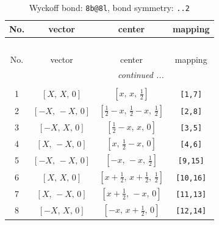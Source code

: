 \documentclass[fleqn,8pt]{jsarticle}
\begin{document}
\begin{longtable}{cccc}
\caption{Wyckoff bond: {\tt 8b@8l}, bond symmetry: {\tt ..2}}
 \\
 \hline \hline
No. & vector & center & mapping \\ \hline \endfirsthead

\multicolumn{3}{l}{\tablename\ \thetable{}} \\
 \hline \hline
No. & vector & center & mapping \\ \hline \endhead

 \hline \hline
\multicolumn{3}{r}{\footnotesize\it continued ...} \\ \endfoot

 \hline \hline
\multicolumn{3}{r}{} \\ \endlastfoot

1 & $\left[ X,\, X,\, 0 \right]$ & $\left[ x,\, x,\, \frac{1}{2} \right]$ & {\tt [1,7]} \\ \hline
2 & $\left[ - X,\, - X,\, 0 \right]$ & $\left[ \frac{1}{2} - x,\, \frac{1}{2} - x,\, \frac{1}{2} \right]$ & {\tt [2,8]} \\ \hline
3 & $\left[ - X,\, X,\, 0 \right]$ & $\left[ \frac{1}{2} - x,\, x,\, 0 \right]$ & {\tt [3,5]} \\ \hline
4 & $\left[ X,\, - X,\, 0 \right]$ & $\left[ x,\, \frac{1}{2} - x,\, 0 \right]$ & {\tt [4,6]} \\ \hline
5 & $\left[ - X,\, - X,\, 0 \right]$ & $\left[ - x,\, - x,\, \frac{1}{2} \right]$ & {\tt [9,15]} \\ \hline
6 & $\left[ X,\, X,\, 0 \right]$ & $\left[ x + \frac{1}{2},\, x + \frac{1}{2},\, \frac{1}{2} \right]$ & {\tt [10,16]} \\ \hline
7 & $\left[ X,\, - X,\, 0 \right]$ & $\left[ x + \frac{1}{2},\, - x,\, 0 \right]$ & {\tt [11,13]} \\ \hline
8 & $\left[ - X,\, X,\, 0 \right]$ & $\left[ - x,\, x + \frac{1}{2},\, 0 \right]$ & {\tt [12,14]} \\
\end{longtable}
\renewcommand{\arraystretch}{1.2}
\end{document}
